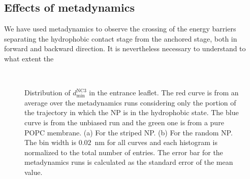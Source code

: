 \subsection{Effects of metadynamics}
We have used metadynamics to observe the crossing of the energy barriers separating the hydrophobic contact stage 
from the anchored stage, both in forward and backward direction. It is nevertheless necessary to understand to 
what extent the
\begin{figure}[hb!]
	\center
	\\%
	\caption{Distribution of $d_\text{min}^{\text{NC}3}$ in the entrance leaflet. The red curve is from an average over the metadynamics runs considering only the portion of the trajectory in which the \acs{NP} is in the hydrophobic state. The blue curve is from the unbiased run and the green one is from a pure \acs{POPC} membrane. (a) For the striped \acs{NP}. (b) For the random \acs{NP}. The bin width is $0.02$~nm for all curves and each histogram is normalized to the total number of entries. The error bar for the metadynamics runs is calculated as the standard error of the mean value.}%
	\label{fig:NC3minDistUn}
\end{figure}
